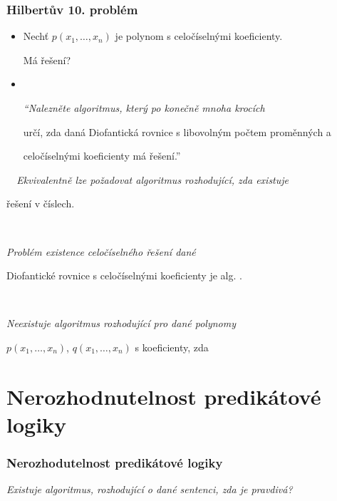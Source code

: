 \subsubsection*{Hilbertův 10. problém}
    \begin{itemize}
    \item Nechť $p(x_1,\dots,x_n)$ je polynom s celočíselnými koeficienty.
    \smallskip
    
    Má    řešení?
    \smallskip
    
    \item {}\ \ {\it ``Nalezněte algoritmus, který po konečně mnoha krocích
    \smallskip
    
    určí, zda daná Diofantická rovnice s libovolným počtem proměnných a
    \smallskip
    
    celočíselnými koeficienty má  řešení.''}
    \end{itemize}
    \smallskip
    
    {\it {}\ \ Ekvivalentně lze požadovat algoritmus rozhodující, zda existuje
    \smallskip
    
    řešení v  číslech.}
    \medskip
    
    \smallskip
    
     \ \ {\it Problém existence celočíselného řešení dané
    \smallskip
    
    Diofantické rovnice s celočíselnými koeficienty je alg. .}
    \medskip
    
    \smallskip
    
    {\bf {}}\ \ {\it Neexistuje algoritmus rozhodující pro dané polynomy
    \smallskip
    
    $p(x_1,\dots,x_n)$, $q(x_1,\dots,x_n)$ s  koeficienty, zda}
    
    
    
    

\section{Nerozhodnutelnost predikátové logiky}\todo

\subsubsection*{Nerozhodutelnost predikátové logiky}
{\it Existuje algoritmus, rozhodující o dané sentenci, zda je  pravdivá?} %
\smallskip

